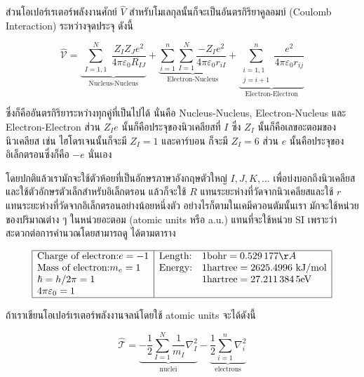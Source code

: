 ส่วนโอเปอร์เรเตอร์พลังงานศักย์ $\hat{V}$ สำหรับโมเลกุลนั้นก็จะเป็นอันตรกิริยาคูลอมบ์ (Coulomb Interaction) ระหว่างจุดประจุ ดังนี้

\begin{equation}
    \label{eq:potential_operator_molecule}
    \hat{\mathcal{V}} 
    = \underbrace{\sum_{\substack{I=1,1}}^N \frac{Z_I Z_J e^2}{4 \pi \varepsilon_0 R_{I J}}}
        _{\text{Nucleus-Nucleus}}
        + \underbrace{\sum_{i=1}^n \sum_{I=1}^N \frac{-Z_I e^2}{4 \pi \varepsilon_0 r_{i I}}}
            _{\text{Electron-Nucleus}}
        + \underbrace{\sum_{\substack{i=1,1 \\ j=i+1}}^n \frac{e^2}{4 \pi \varepsilon_0 r_{i j}}}
            _{\text{Electron-Electron}}
\end{equation}

\noindent ซึ่งก็คืออันตรกิริยาระหว่างทุกคู่ที่เป็นไปได้ นั่นคือ Nucleus-Nucleus, Electron-Nucleus และ Electron-Electron 
ส่วน $Z_I e$ นั้นก็คือประจุของนิวเคลียสที่ $I$ ซึ่ง $Z_I$ นั้นก็คือเลขอะตอมของนิวเคลียส เช่น ไฮโดรเจนนั้นก็จะมี $Z_I = 1$ และคาร์บอน%
ก็จะมี $Z_I=6$ ส่วน $e$ นั้นคือประจุของอิเล็กตรอนซึ่งก็คือ $-e$ นั่นเอง 

โดยปกติแล้วเรามักจะใช้ตัวห้อยที่เป็นอักษรภาษาอังกฤษตัวใหญ่ $I, J, K, \ldots$ เพื่อบ่งบอกถึงนิวเคลียสและใช้ตัวอักษรตัวเล็กสำหรับอิเล็กตรอน  
แล้วก็จะใช้ $R$ แทนระยะห่างที่วัดจากนิวเคลียสและใช้ $r$ แทนระยะห่างที่วัดจากอิเล็กตรอนอย่างน้อยหนึ่งตัว อย่างไรก็ตามในเคมีควอนตัมนั้นเรา%
มักจะใช้หน่วยของปริมาณต่าง ๆ ในหน่วยอะตอม (atomic units หรือ a.u.) แทนที่จะใช้หน่วย SI เพราะว่าสะดวกต่อการคำนวณโดยสามารถดู%
ได้ตามตาราง 

\begin{equation*}
    \begin{array}{|l|ll|}
        \hline \text{Charge of electron:} e=-1 & \text{Length:} & 1 \text{bohr} = \num{0.529177} \AA \\
        \text{Mass of electron:} m_e=1 & \text{Energy:} & 1 \text{hartree} = \num{2625.4996} \mathrm{~kJ} / \mathrm{mol} \\
        \hbar=h / 2 \pi=1 & & 1 \text{hartree} = \num{27.2113845} \mathrm{eV} \\
        4 \pi \varepsilon_0=1 & & \\
        \hline
    \end{array}
\end{equation*}

ถ้าเราเขียนโอเปอร์เรเตอร์พลังงานจลน์โดยใช้ atomic units จะได้ดังนี้

\begin{equation}
    \label{eq:kinetic_operator_au}
    \hat{\mathscr{T}} 
    = \underbrace{-\frac{1}{2} \sum_{I=1}^N \frac{1}{m_I} \nabla_I^2}_{\text{nuclei}} 
        - \underbrace{\frac{1}{2} \sum_{i=1}^n \nabla_i^2}_{\text{electrons}}
\end{equation}

